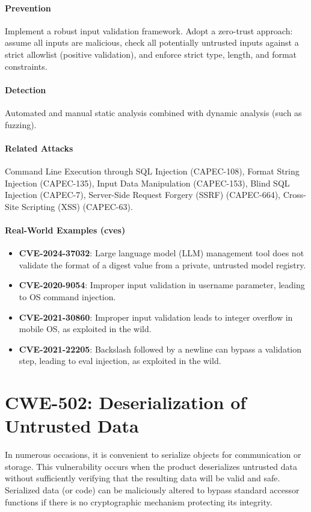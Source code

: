 \paragraph{Prevention} Implement a robust input validation framework. Adopt a zero-trust approach: assume all inputs are malicious, check all potentially untrusted inputs against a strict allowlist (positive validation), and enforce strict type, length, and format constraints.

\paragraph{Detection} Automated and manual static analysis combined with dynamic analysis (such as fuzzing).

\paragraph{Related Attacks} Command Line Execution through SQL Injection (CAPEC-108), Format String Injection (CAPEC-135), Input Data Manipulation (CAPEC-153), Blind SQL Injection (CAPEC-7), Server-Side Request Forgery (SSRF) (CAPEC-664), Cross-Site Scripting (XSS) (CAPEC-63).

\paragraph{Real-World Examples (\glspl{cve})}
\begin{itemize}
    \item \textbf{CVE-2024-37032}: Large language model (LLM) management tool does not validate the format of a digest value from a private, untrusted model registry.
    \item \textbf{CVE-2020-9054}: Improper input validation in username parameter, leading to OS command injection.
    \item \textbf{CVE-2021-30860}: Improper input validation leads to integer overflow in mobile OS, as exploited in the wild.
    \item \textbf{CVE-2021-22205}: Backslash followed by a newline can bypass a validation step, leading to eval injection, as exploited in the wild.
\end{itemize}

\section{CWE-502: Deserialization of Untrusted Data}
In numerous occasions, it is convenient to serialize objects for communication or storage. This vulnerability occurs when the product deserializes untrusted data without sufficiently verifying that the resulting data will be valid and safe. Serialized data (or code) can be maliciously altered to bypass standard accessor functions if there is no cryptographic mechanism protecting its integrity.

